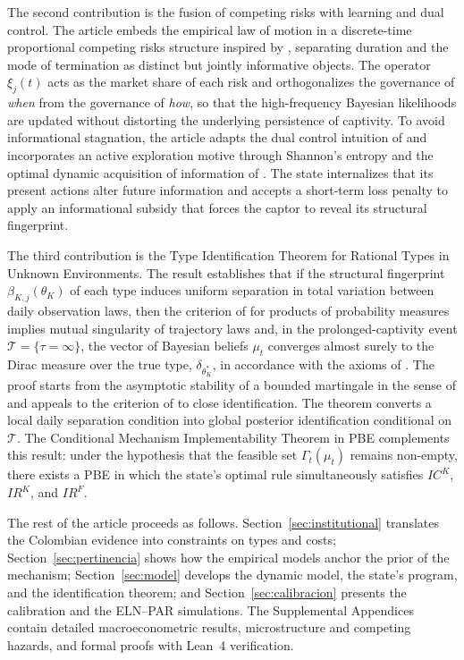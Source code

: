 \documentclass[review,authoryear,12pt]{elsarticle}
\theoremstyle{plain}
\theoremstyle{definition}
\newcommand{\1}{\mathbf{1}}
\newcommand{\Dirac}{\delta}
\begin{document}
The second contribution is the fusion of competing risks with learning and dual control. The article embeds the empirical law of motion in a discrete-time proportional competing risks structure inspired by \citet{Cox1972}, separating duration and the mode of termination as distinct but jointly informative objects. The operator $\xi_j(t)$ acts as the market share of each risk and orthogonalizes the governance of \emph{when} from the governance of \emph{how}, so that the high-frequency Bayesian likelihoods are updated without distorting the underlying persistence of captivity. To avoid informational stagnation, the article adapts the dual control intuition of \citet{Feldbaum1965} and incorporates an active exploration motive through Shannon's entropy \citet{Shannon1948} and the optimal dynamic acquisition of information of \citet{Zhong2022}. The state internalizes that its present actions alter future information and accepts a short-term loss penalty to apply an informational subsidy that forces the captor to reveal its structural fingerprint.

The third contribution is the Type Identification Theorem for Rational Types in Unknown Environments. The result establishes that if the structural fingerprint $\beta_{K,j}(\theta_K)$ of each type induces uniform separation in total variation between daily observation laws, then the criterion of \citet{Kakutani1948} for products of probability measures implies mutual singularity of trajectory laws and, in the prolonged-captivity event $\mathcal{T}=\{\tau=\infty\}$, the vector of Bayesian beliefs $\mu_t$ converges almost surely to the Dirac measure over the true type, $\Dirac_{\theta_K^\ast}$, in accordance with the axioms of \citet{BlackwellDubins1962}. The proof starts from the asymptotic stability of a bounded martingale in the sense of \citet{Doob1953Stochastic} and appeals to the criterion of \citet{Kakutani1948} to close identification. The theorem converts a local daily separation condition into global posterior identification conditional on $\mathcal{T}$. The Conditional Mechanism Implementability Theorem in PBE complements this result: under the hypothesis that the feasible set $\Gamma_t(\mu_t)$ remains non-empty, there exists a PBE in which the state's optimal rule simultaneously satisfies $IC^K$, $IR^K$, and $IR^F$.

The rest of the article proceeds as follows. Section~\ref{sec:institutional} translates the Colombian evidence into constraints on types and costs; Section~\ref{sec:pertinencia} shows how the empirical models anchor the prior of the mechanism; Section~\ref{sec:model} develops the dynamic model, the state's program, and the identification theorem; and Section~\ref{sec:calibracion} presents the calibration and the ELN--PAR simulations. The Supplemental Appendices contain detailed macroeconometric results, microstructure and competing hazards, and formal proofs with Lean~4 verification.
\end{document}
